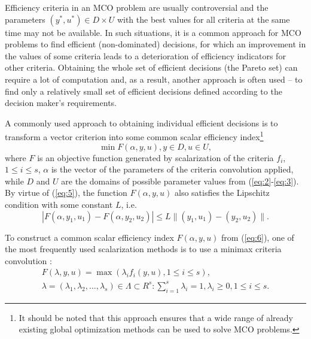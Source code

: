 \documentclass{svproc}
\begin{document}
Efficiency criteria in an MCO problem are usually controversial and the parameters $(y^*,u^*) \in D \times U$ with the best values for all criteria at the same time may not be available. In such situations, it is a common approach for MCO problems to find efficient (non-dominated) decisions, for which an improvement in the values of some criteria leads to a deterioration of efficiency indicators for other criteria. Obtaining the whole set of efficient decisions (the Pareto set) can require a lot of computation and, as a result, another approach is often used -- to find only a relatively small set of efficient decisions defined according to the decision maker's requirements.

A commonly used approach to obtaining individual efficient decisions is to transform a vector criterion into some common scalar efficiency index\footnote{It should be noted that this approach ensures that a wide range of already existing global optimization methods can be used to solve MCO problems.}
\begin{equation}\label{eq:6}
  \min{F(\alpha,y,u)}, y \in D, u \in U,
\end{equation}
where $F$ is an objective function generated by scalarization of the criteria $f_i$, $1 \leq i \leq s$, $\alpha$ is the vector of the parameters of the criteria convolution applied, while $D$ and $U$ are the domains of possible parameter values from (\ref{eq:2}-\ref{eq:3}). By virtue of (\ref{eq:5}), the function $F(\alpha, y, u)$ also satisfies the Lipschitz condition with some constant $L$, i.e.  
\begin{equation}\label{eq:7}
  |F(\alpha, y_1, u_1)-F(\alpha, y_2, u_2)| \leq L\|(y_1,u_1)-(y_2,u_2)\|.
\end{equation}

To construct a common scalar efficiency index $F(\alpha,y,u)$ from (\ref{eq:6}), one of the most frequently used scalarization methods is to use a minimax criteria convolution \cite{c2,c5}:
\begin{equation}\label{eq:8}
\begin{matrix}
  F(\lambda,y,u)=\max{(\lambda_i f_i (y,u),1\leq i \leq s)},\\
  \lambda=(\lambda_1,\lambda_2, \dots, \lambda_s)\in \Lambda \subset R^s: \sum_{i=1}^{s}\lambda_i=1, \lambda_i \geq 0, 1 \leq i \leq s.
\end{matrix}
\end{equation}
\end{document}
